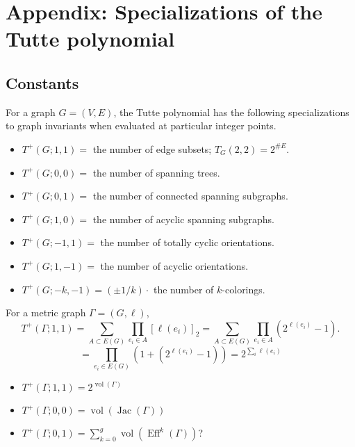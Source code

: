 \documentclass{amsart}
\theoremstyle{definition}
\DeclareMathOperator{\Eff}{Eff}
\DeclareMathOperator{\Jac}{Jac}
\DeclareMathOperator{\vol}{vol}
\begin{document}
\section*{Appendix: Specializations of the Tutte polynomial}

\subsection{Constants}
For a graph $G = (V,E)$, the Tutte polynomial has the following specializations to graph invariants when evaluated at particular integer points.

\begin{itemize}
\item 
$T^+(G;1,1)=$  the number of edge subsets;
$T_G(2,2) = 2^{\# E}$.

\item 
$T^+(G;0,0) =$ the number of spanning trees.

\item 
$T^+(G;0,1) =$ the number of connected spanning subgraphs.

\item 
$T^+(G;1,0) =$ the number of acyclic spanning subgraphs.

\item 
$T^+(G;-1,1) =$ the number of totally cyclic orientations.

\item 
$T^+(G;1,-1) =$ the number of acyclic orientations.

\item 
$T^+(G; -k, -1) = (\pm 1/k)\cdot$ the number of $k$-colorings.
\end{itemize}

For a metric graph $\Gamma = (G,\ell)$,
\[ T^+(\Gamma;1,1) = \sum_{A \subset E(G)} \prod_{e_i \in A} [\ell(e_i)]_{2}
= \sum_{A \subset E(G)} \prod_{e_i \in A} (2^{\ell(e_i)} - 1) .\]
\[ = \prod_{e_i \in E(G)} (1 + (2^{\ell(e_i)} - 1))
 = 2^{\sum_i \ell(e_i)}\]
\begin{itemize}
\item 
$T^+(\Gamma;1,1) = 2^{\vol(\Gamma)}$

\item 
$T^+(\Gamma;0,0) = \vol(\Jac(\Gamma))$

\item 
$T^+(\Gamma;0,1) = \sum_{k=0}^g \vol(\Eff^k(\Gamma))$?

\end{itemize}
\end{document}

